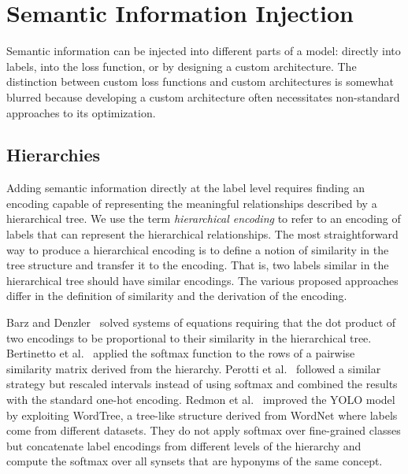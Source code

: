 \section{Semantic Information Injection}
\label{sec:semantic-information-injection}

Semantic information can be injected into different parts of a model: directly into labels, into the loss function, or by designing a custom architecture. The distinction between custom loss functions and custom architectures is somewhat blurred because developing a custom architecture often necessitates non-standard approaches to its optimization.

\subsection{Hierarchies}
\label{subsec:hierarchies}

Adding semantic information directly at the label level requires finding an encoding capable of representing the meaningful relationships described by a hierarchical tree. We use the term \emph{hierarchical encoding} to refer to an encoding of labels that can represent the hierarchical relationships. The most straightforward way to produce a hierarchical encoding is to define a notion of similarity in the tree structure and transfer it to the encoding. That is, two labels similar in the hierarchical tree should have similar encodings. The various proposed approaches differ in the definition of similarity and the derivation of the encoding. 

Barz and Denzler~\cite{HierarchyBasedBarz2018} solved systems of equations requiring that the dot product of two encodings to be proportional to their similarity in the hierarchical tree.
Bertinetto et al.~\cite{MakingBetterMBertin2019} applied the softmax function to the rows of a pairwise similarity matrix derived from the hierarchy.
Perotti et al.~\cite{BeyondOneHotPerott2023} followed a similar strategy but rescaled intervals instead of using softmax and combined the results with the standard one-hot encoding.
Redmon et al.~\cite{Yolo9000BetteRedmon2016} improved the YOLO model~\cite{YouOnlyLookORedmon2015} by exploiting WordTree, a tree-like structure derived from WordNet where labels come from different datasets. They do not apply softmax over fine-grained classes but concatenate label encodings from different levels of the hierarchy and compute the softmax over all synsets that are hyponyms of the same concept.


